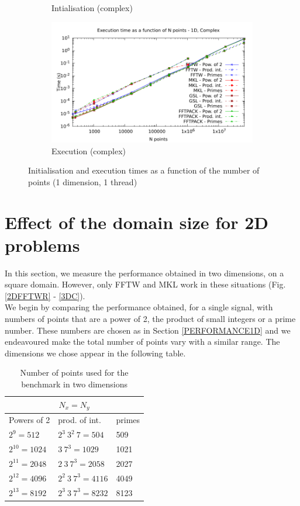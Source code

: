 \documentclass[12pt, a4paper]{article}
\begin{document}
\begin{figure}[H]
\begin{subfigure}{.5\textwidth}
\caption{Intialisation (complex)}
\label{1DCI}
\end{subfigure}%
\begin{subfigure}{.5\textwidth}
\centering
\includegraphics[width=.9\linewidth]{graphs/1d-exec-c.pdf}
\caption{Execution (complex)}
\label{1DC}
\end{subfigure}
\caption{Initialisation and execution times as a function of the number of points (1 dimension, 1 thread)}
\label{1D}
\end{figure}

\section{Effect of the domain size for 2D problems}\label{PERFORMANCE2D}

In this section, we measure the performance obtained in two dimensions, on a square domain. However, only FFTW and MKL work in these situations (Fig. \ref{2DFFTWR} - \ref{3DC}).\\

We begin by comparing the performance obtained, for a single signal, with numbers of points that are a power of 2, the product of small integers or a prime number. These numbers are chosen as in Section \ref{PERFORMANCE1D} and we endeavoured make the total number of points vary with a similar range. The dimensions we chose appear in the following table.\\

\begin{table}[H]
\centering
\begin{tabular}{|l|l|l|}
  \hline
  \multicolumn{3}{|c|}{$N_x=N_y$}\\
  \hline
  \hline
Powers of 2 & prod. of int. & primes\\ \hline
$2^9=512$ & $2^3\ 3^2\ 7=504$ & 509\\ \hline
$2^{10}=1024$ & $3\ 7^3=1029$ & 1021\\ \hline
$2^{11}=2048$ & $2\ 3\ 7^3=2058$ & 2027\\ \hline
$2^{12}=4096$ & $2^2\ 3\ 7^3=4116$ & 4049\\ \hline
$2^{13}=8192$ & $2^3\ 3\ 7^3=8232$ & 8123\\ \hline
\end{tabular}
\caption{Number of points used for the benchmark in two dimensions}
\end{table}
\end{document}

